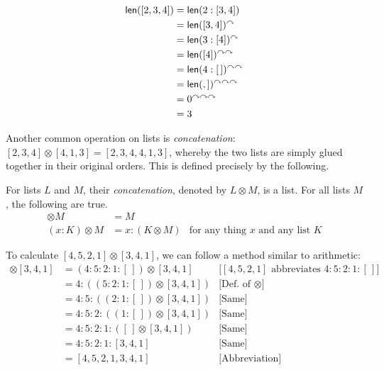\begin{example}
  \begin{align*}
    \mathord{\textsf{len}}([2,3,4]) &= \mathord{\textsf{len}}(2:[3,4])\\
    &= \mathord{\textsf{len}}([3,4])^\curvearrowright\\
    &= \mathord{\textsf{len}}(3:[4])^\curvearrowright\\
    &= \mathord{\textsf{len}}([4])^{\curvearrowright\curvearrowright}\\
    &= \mathord{\textsf{len}}(4:[\,])^{\curvearrowright\curvearrowright}\\
    &= \mathord{\textsf{len}}(,])^{\curvearrowright\curvearrowright\curvearrowright}\\
    &= 0^{\curvearrowright\curvearrowright\curvearrowright}\\
    &= 3
  \end{align*}
\end{example}

\ipadbreak

Another common operation on lists is \emph{concatenation}:
$[2,3,4]\otimes[4,1,3] = [2,3,4,4,1,3]$, whereby the two lists are simply glued together in their original orders.  This is defined precisely by
the following.

\begin{defn}
  For lists $L$ and $M$, their \emph{concatenation}, denoted by
  $L\otimes M$, is a list. For all lists $M$, the following are true.
  \begin{align*}
    [\,]\otimes M &= M\\
    (x:K)\otimes M &= x:(K\otimes M) & \text{for any thing $x$ and any list $K$}
  \end{align*}
\end{defn}

\begin{example}
  To calculate $[4,5,2,1] \otimes [3,4,1]$, we can follow a method similar to arithmetic:
  \begin{align*}
    [4,5,2,1]\otimes[3,4,1] &= (4:5:2:1:[\,])\otimes[3,4,1] & \text{[$[4,5,2,1]$ abbreviates $4:5:2:1:[\,]$]}\\
                    &= 4:((5:2:1:[\,])\otimes[3,4,1]) &\text{[Def. of $\otimes$]}\\
                    &= 4:5:((2:1:[\,])\otimes[3,4,1]) & \text{[Same]}\\
                    &= 4:5:2:((1:[\,])\otimes[3,4,1]) &\text{[Same]}\\
                    &= 4:5:2:1:([\,]\otimes[3,4,1])  &\text{[Same]}\\
                    &= 4:5:2:1:[3,4,1] &\text{[Same]}\\
                    &= [4,5,2,1,3,4,1]                &\text{[Abbreviation]}
  \end{align*}
\end{example}

